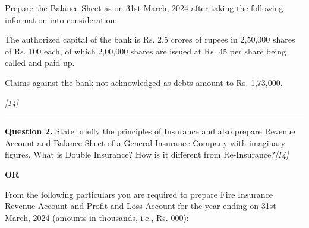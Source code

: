 \documentclass[11pt,a4paper]{article}
\newcommand{\pts}[1]{\hfill   \textit{[#1]}}
\begin{document}
Prepare the Balance Sheet as on 31st March, 2024 after taking the following information into consideration:

\begin{parts}
  \item The authorized capital of the bank is Rs. 2.5 crores of rupees in 2,50,000 shares of Rs. 100 each, of which 2,00,000 shares are issued at Rs. 45 per share being called and paid up.
  \item Claims against the bank not acknowledged as debts amount to Rs. 1,73,000.
\end{parts}\pts{14}

\medskip\rule{\linewidth}{0.2pt}

\pagebreak




\noindent   \textbf{Question 2.}
State briefly the principles of Insurance and also prepare Revenue Account and Balance Sheet of a General Insurance Company with imaginary figures. What is Double Insurance? How is it different from Re-Insurance?\pts{14}

\centerline{   \textbf{OR}}

From the following particulars you are required to prepare Fire Insurance Revenue Account and Profit and Loss Account for the year ending on 31st March, 2024 (amounts in thousands, i.e., Rs. 000):
\end{document}
